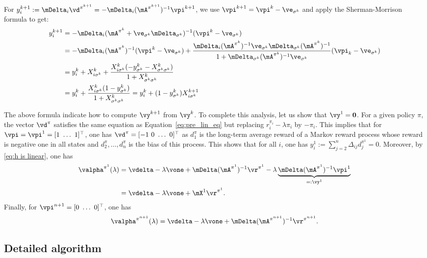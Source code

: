 For $y^{k+1}_i := \mDelta_{i}\vd^{\pi^{k+1}} = -\mDelta_i(\mA^{\pi^{k+1}})^{-1} \vpi^{k+1}$, we use $\vpi^{k+1}=\vpi^k - \ve_{\sigma^k}$ and apply the Sherman-Morrison formula to get:
\begin{align}
    y^{k+1}_i &= -\mDelta_i(\mA^{\pi^{k}}+\ve_{\sigma^k}\mDelta_{\sigma^k})^{-1} (\vpi^k-\ve_{\sigma^k})\nonumber\\
              &= -\mDelta_i (\mA^{\pi^{k}})^{-1}(\vpi^k-\ve_{\sigma^k})  + \frac{\mDelta_i (\mA^{\pi^{k}})^{-1} \ve_{\sigma^k}\mDelta_{\sigma^k}(\mA^{\pi^{k}})^{-1}}{1 + \mDelta_{\sigma^k} (\mA^{\pi^{k}})^{-1} \ve_{\sigma^k}} (\vpi_k-\ve_{\sigma^k})\nonumber\\
    &= y^k_i + X^k_{i\sigma^k} + \frac{X^k_{i\sigma^k}(-y^k_{\sigma^k} - X^{k}_{\sigma^k\sigma^k})}{1+X^{k}_{\sigma^k\sigma^k}}\nonumber\\
    &= y^k_i + \frac{X^k_{i\sigma^k}(1-y^k_{\sigma^k})}{1+X^{k}_{\sigma^k\sigma^k}} =y^k_i +(1-y^k_{\sigma^k})X^{k+1}_{i\sigma^k}\label{eq:y^k+1-i}
\end{align}

The above formula indicate how to compute $\vy^{k+1}$ from $\vy^k$. To complete this analysis, let us show that $\vy^1=\mathbf{0}$. For a given policy $\pi$, the vector $\vd^{\pi}$ satisfies the same equation as Equation~\eqref{eq:pre_lin_eq} but replacing $r^{\pi_i}_i-\lambda\pi_i$ by $-\pi_i$. This implies that for $\vpi=\vpi^1=[1\ \dots\ 1]^\top$, one has $\vd^\pi=[-1\ 0\ \dots\ 0]^\top$ as $d^\pi_1$ is the long-term average reward of a Markov reward process whose reward is negative one in all states and $d^\pi_2,\dots, d^\pi_n$ is the bias of this process.  This shows that for all $i$, one has
$y^{1}_i:=\sum_{j=2}^n\Delta_{ij}d_j^{\pi^{1}}=0$.
Moreover, by \eqref{eq:h is linear}, one has
\begin{align}
    \valpha^{\pi^1}(\lambda)
    &=\vdelta -\lambda\vone +\mDelta(\mA^{\pi^1})^{-1}\vr^{\pi^1} -\lambda\underbrace{\mDelta(\mA^{\pi^1})^{-1}\vpi^1}_{=:\vy^1} \nonumber\\
    &=\vdelta -\lambda\vone +\mX^1\vr^{\pi^1}. \label{eq:b_pi_one}
\end{align}
Finally, for $\vpi^{n+1}=[0\ \dots\ 0]^\top$, one has
\begin{equation}
    \label{eq:b_pi_n1}
    \valpha^{\pi^{n+1}}(\lambda)
    =\vdelta -\lambda\vone +\mDelta(\mA^{\pi^{n+1}})^{-1}\vr^{\pi^{n+1}}.
\end{equation}

\subsection{Detailed algorithm}
\label{ssec:two_third_algo}

